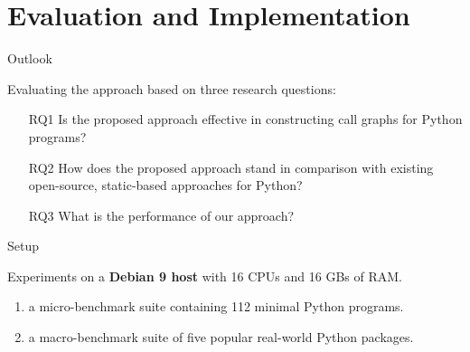 \documentclass[9pt, xcolor=table]{beamer}
\begin{document}
\section{Evaluation and Implementation} 
%
\begin{frame}{Outlook}
	
	Evaluating the approach based on three research questions:
	\begin{exampleblock}{}
		\begin{itemize}
			\item[RQ1] Is the proposed approach effective in constructing call
			graphs for Python programs?
			\item[RQ2] How does the proposed approach stand in comparison
			with existing open-source, static-based approaches for
			Python? 
			\item[RQ3] What is the performance of our approach?
		\end{itemize}
	\end{exampleblock}
\end{frame}

\begin{frame}{Setup}
	\begin{alertblock}{Experiments on a \textbf{Debian 9 host} with 16 CPUs and 16 GBs of RAM.}			
		\begin{enumerate}
			\item a micro-benchmark suite containing 112 minimal Python programs.
			\item a macro-benchmark suite of five popular real-world Python packages.	
		\end{enumerate}
	\end{alertblock}

\end{frame}
% 
%
\end{document}
